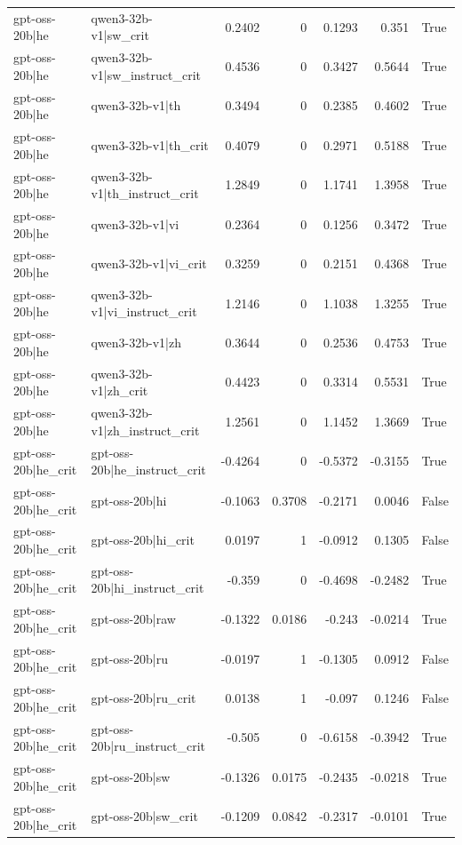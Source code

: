\begin{table}
\begin{tabular}{l l r r r r l}
gpt-oss-20b|he & qwen3-32b-v1|sw_crit & 0.2402 & 0 & 0.1293 & 0.351 & True \\
gpt-oss-20b|he & qwen3-32b-v1|sw_instruct_crit & 0.4536 & 0 & 0.3427 & 0.5644 & True \\
gpt-oss-20b|he & qwen3-32b-v1|th & 0.3494 & 0 & 0.2385 & 0.4602 & True \\
gpt-oss-20b|he & qwen3-32b-v1|th_crit & 0.4079 & 0 & 0.2971 & 0.5188 & True \\
gpt-oss-20b|he & qwen3-32b-v1|th_instruct_crit & 1.2849 & 0 & 1.1741 & 1.3958 & True \\
gpt-oss-20b|he & qwen3-32b-v1|vi & 0.2364 & 0 & 0.1256 & 0.3472 & True \\
gpt-oss-20b|he & qwen3-32b-v1|vi_crit & 0.3259 & 0 & 0.2151 & 0.4368 & True \\
gpt-oss-20b|he & qwen3-32b-v1|vi_instruct_crit & 1.2146 & 0 & 1.1038 & 1.3255 & True \\
gpt-oss-20b|he & qwen3-32b-v1|zh & 0.3644 & 0 & 0.2536 & 0.4753 & True \\
gpt-oss-20b|he & qwen3-32b-v1|zh_crit & 0.4423 & 0 & 0.3314 & 0.5531 & True \\
gpt-oss-20b|he & qwen3-32b-v1|zh_instruct_crit & 1.2561 & 0 & 1.1452 & 1.3669 & True \\
gpt-oss-20b|he_crit & gpt-oss-20b|he_instruct_crit & -0.4264 & 0 & -0.5372 & -0.3155 & True \\
gpt-oss-20b|he_crit & gpt-oss-20b|hi & -0.1063 & 0.3708 & -0.2171 & 0.0046 & False \\
gpt-oss-20b|he_crit & gpt-oss-20b|hi_crit & 0.0197 & 1 & -0.0912 & 0.1305 & False \\
gpt-oss-20b|he_crit & gpt-oss-20b|hi_instruct_crit & -0.359 & 0 & -0.4698 & -0.2482 & True \\
gpt-oss-20b|he_crit & gpt-oss-20b|raw & -0.1322 & 0.0186 & -0.243 & -0.0214 & True \\
gpt-oss-20b|he_crit & gpt-oss-20b|ru & -0.0197 & 1 & -0.1305 & 0.0912 & False \\
gpt-oss-20b|he_crit & gpt-oss-20b|ru_crit & 0.0138 & 1 & -0.097 & 0.1246 & False \\
gpt-oss-20b|he_crit & gpt-oss-20b|ru_instruct_crit & -0.505 & 0 & -0.6158 & -0.3942 & True \\
gpt-oss-20b|he_crit & gpt-oss-20b|sw & -0.1326 & 0.0175 & -0.2435 & -0.0218 & True \\
gpt-oss-20b|he_crit & gpt-oss-20b|sw_crit & -0.1209 & 0.0842 & -0.2317 & -0.0101 & True \\

\end{tabular}
\end{table}
